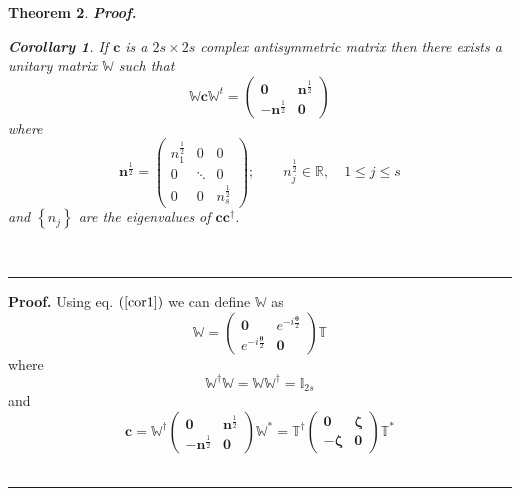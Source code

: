 \documentclass[aps,preprint]{revtex4}
\newtheorem{theorem}{Theorem}
\newtheorem{corollary}[theorem]{Corollary}
\newenvironment{proof}[1][Proof]{\noindent\textbf{#1.} }{\ \rule{0.5em}{0.5em}}
\begin{document}
\begin{theorem}
\begin{proof}
\begin{corollary}
If $\mathbf{c}$ is a $2s\times 2s$ complex antisymmetric matrix then there
exists a unitary matrix $\mathbb{W}$ such that 
\begin{equation}
\mathbb{W}\mathbf{c}\mathbb{W}^{t}\mathbb{=}\left( 
\begin{array}{cc}
\mathbf{0} & \mathbf{n}^{\frac{1}{2}} \\ 
-\mathbf{n}^{\frac{1}{2}} & \mathbf{0}%
\end{array}%
\right)
\end{equation}%
where 
\begin{equation}
\mathbf{n}^{\frac{1}{2}}=\left( 
\begin{array}{ccc}
n_{1}^{\frac{1}{2}} & 0 & 0 \\ 
0 & \ddots & 0 \\ 
0 & 0 & n_{s}^{\frac{1}{2}}%
\end{array}%
\right) ;\qquad n_{j}^{\frac{1}{2}}\in \mathbb{R},\quad 1\leq j\leq s
\end{equation}%
and $\left\{ n_{j}\right\} $ are the eigenvalues of $\mathbf{cc}^{\dagger }$.
\end{corollary}
\end{proof}
\end{theorem}

\begin{proof}
Using eq. $\left( \ref{cor1}\right) $ we can define $\mathbb{W}$ as 
\begin{equation}
\mathbb{W=}\left( 
\begin{array}{cc}
\mathbf{0} & e^{-i\frac{\mathbf{\theta }}{2}} \\ 
e^{-i\frac{\mathbf{\theta }}{2}} & \mathbf{0}%
\end{array}%
\right) \mathbb{T}
\end{equation}%
where 
\begin{equation}
\mathbb{W}^{\dagger }\mathbb{W=WW}^{\dagger }\mathbb{=I}_{2s}
\end{equation}%
and 
\begin{equation}
\mathbf{c}=\mathbb{W}^{\dagger }\left( 
\begin{array}{cc}
\mathbf{0} & \mathbf{n}^{\frac{1}{2}} \\ 
-\mathbf{n}^{\frac{1}{2}} & \mathbf{0}%
\end{array}%
\right) \mathbb{W}^{\ast }=\mathbb{T}^{\dagger }\left( 
\begin{array}{cc}
\mathbf{0} & \mathbf{\zeta } \\ 
-\mathbf{\zeta } & \mathbf{0}%
\end{array}%
\right) \mathbb{T}^{\ast }  \label{cex}
\end{equation}
\end{proof}
\end{document}
